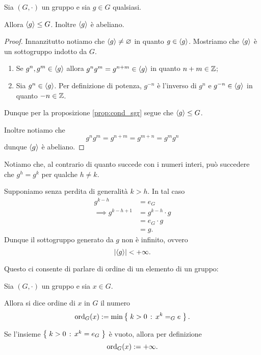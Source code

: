 \begin{proposition}
     \label{prop:sgr_generato_è_sgr}
    Sia $(G, \cdot)$ un gruppo e sia $g \in G$ qualsiasi.

    Allora $\gen{g} \sgr G$. Inoltre $\gen{g}$ è abeliano.
\end{proposition}
\begin{proof}
    Innanzitutto notiamo che $\gen{g} \neq \varnothing$ in quanto $g \in \gen{g}$. Mostriamo che $\gen{g}$ è un sottogruppo indotto da $G$.

    \begin{enumerate}[label={(\roman*)}]
        \item Se $g^n, g^m \in \gen{g}$ allora $g^ng^m = g^{n+m} \in \gen{g}$ in quanto $n+m \in \Z$;
        \item Sia $g^n \in \gen{g}$. Per definizione di potenza, $g^{-n}$ è l'inverso di $g^n$ e $g^{-n} \in \gen{g}$ in quanto $-n \in \Z$. 
    \end{enumerate}

    Dunque per la proposizione \ref{prop:cond_sgr} segue che $\gen{g} \sgr G$.

    Inoltre notiamo che \[
        g^ng^m = g^{n+m} = g^{m+n} = g^mg^n    
    \] dunque $\gen{g}$ è abeliano.
\end{proof}

Notiamo che, al contrario di quanto succede con i numeri interi, può succedere che $g^h = g^k$ per qualche $h \neq k$.

Supponiamo senza perdita di generalità $k > h$. In tal caso \begin{align*}
    g^{k-h} &= e_G\\
    \implies g^{k-h+1} &= g^{k-h} \cdot g\\
    &= e_G \cdot g\\
    &= g.
\end{align*}
Dunque il sottogruppo generato da $g$ non è infinito, ovvero \[
    \abs*{\gen*{g}} < +\infty.    
\]

Questo ci consente di parlare di ordine di un elemento di un gruppo:

\begin{definition}
     \label{def:ord_grp}
    Sia $(G, \cdot)$ un gruppo e sia $x \in G$.

    Allora si dice ordine di $x$ in $G$ il numero \[
        \ord[G]{x} \deq \min\set{k > 0 \suchthat x^k = _Ge}.    
    \]

    Se l'insieme $\set{k > 0 \suchthat x^k = e_G}$ è vuoto, allora per definizione \[
        \ord[G]{x} \deq +\infty.
    \]
\end{definition}

